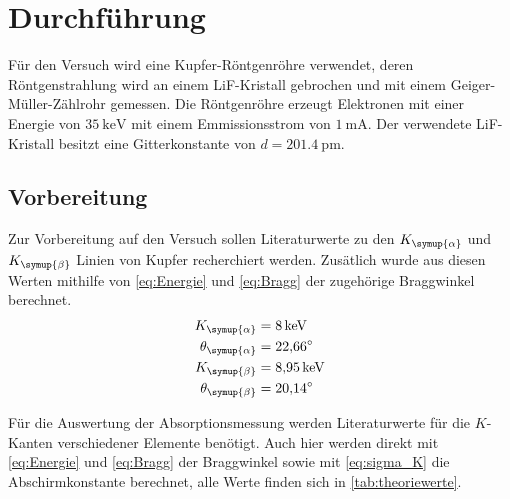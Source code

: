\section{Durchführung}
\label{sec:Durchführung}

Für den Versuch wird eine Kupfer-Röntgenröhre verwendet, deren Röntgenstrahlung wird an einem
LiF-Kristall gebrochen und mit einem Geiger-Müller-Zählrohr gemessen.
Die Röntgenröhre erzeugt Elektronen mit einer Energie von $\qty{35}{\kilo\electronvolt}$ mit einem
Emmissionsstrom von $\qty{1}{\milli\ampere}$.
Der verwendete LiF-Kristall besitzt eine Gitterkonstante von $d=\qty{201.4}{\pico\metre}$.

\subsection{Vorbereitung}
\label{sec:Vorbereitung}

Zur Vorbereitung auf den Versuch sollen Literaturwerte zu den $K_{\symup{\alpha}}$ und $K_{\symup{\beta}}$
Linien von Kupfer recherchiert werden. Zusätlich wurde aus diesen Werten mithilfe von \autoref{eq:Energie}
und \autoref{eq:Bragg} der zugehörige Braggwinkel berechnet.
\begin{align*}
    K_{\symup{\alpha}} &= \qty{8}{\kilo\electronvolt} \\
    \theta_{\symup{\alpha}} &= \qty{22.66}{\degree}\\
    K_{\symup{\beta}} &= \qty{8.95}{\kilo\electronvolt}\\
    \theta_{\symup{\beta}} &= \qty{20.14}{\degree}
\end{align*}

Für die Auswertung der Absorptionsmessung werden Literaturwerte für die $K$-Kanten verschiedener Elemente benötigt.
Auch hier werden direkt mit \autoref{eq:Energie} und \autoref{eq:Bragg} der Braggwinkel sowie mit \autoref{eq:sigma_K} die
Abschirmkonstante berechnet, alle Werte finden sich in \autoref{tab:theoriewerte}.

